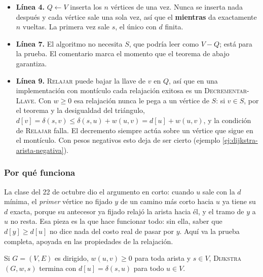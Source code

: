 \documentclass[11pt,letterpaper]{article}
\begin{document}
\begin{itemize}[itemsep=0.1em]
  \item \textbf{Línea 4.} $Q \gets V$ inserta los $n$ vértices de una
        vez. Nunca se inserta nada después y cada vértice sale una
        sola vez, así que el \textbf{mientras} da exactamente $n$
        vueltas. La primera vez sale $s$, el único con $d$ finita.
  \item \textbf{Línea 7.} El algoritmo no necesita $S$, que podría
        leer como $V - Q$; está para la prueba. El comentario marca el
        momento que el teorema de abajo garantiza.
  \item \textbf{Línea 9.} \textsc{Relajar} puede bajar la llave de
        $v$ en $Q$, así que en una implementación con montículo cada
        relajación exitosa es un \textsc{Decrementar-Llave}. Con
        $w \ge 0$ esa relajación nunca le pega a un vértice de $S$: si
        $v \in S$, por el teorema y la desigualdad del triángulo,
        $d[v] = \delta(s, v) \le \delta(s, u) + w(u, v)
        = d[u] + w(u, v)$, y la condición de \textsc{Relajar} falla.
        El decremento siempre actúa sobre un vértice que sigue en el
        montículo. Con pesos negativos esto deja de ser cierto
        (ejemplo \ref{ej:dijkstra-arista-negativa}).
\end{itemize}

\subsubsection*{Por qué funciona}

La clase del 22 de octubre dio el argumento en corto: cuando $u$ sale
con la $d$ mínima, el \emph{primer} vértice no fijado $y$ de un camino
más corto hacia $u$ ya tiene su $d$ exacta, porque su antecesor ya
fijado relajó la arista hacia él, y el tramo de $y$ a $u$ no resta.
Esa pieza es la que hace funcionar todo: sin ella, saber que
$d[y] \ge d[u]$ no dice nada del costo real de pasar por $y$. Aquí va
la prueba completa, apoyada en las propiedades de la relajación.

\begin{teorema}
  \label{teo:dijkstra-correccion}
  Si $G = (V, E)$ es dirigido, $w(u, v) \ge 0$ para toda arista y
  $s \in V$, \textsc{Dijkstra}$(G, w, s)$ termina con
  $d[u] = \delta(s, u)$ para todo $u \in V$.
\end{teorema}
\end{document}
